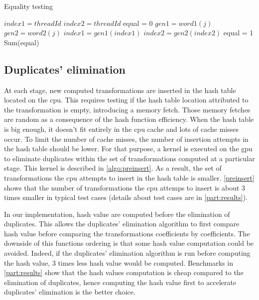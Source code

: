 {\begin{algorithm}
\caption{Equality testing}
\label{algo:equal}
\begin{algorithmic}
\STATE $index1 = threadId$
\STATE $index2 = threadId$
\STATE equal = 0
\STATE $gen1 = word1(j)$
\STATE $gen2 = word2(j)$
\STATE $index1 = gen1(index1)$
\STATE $index2 = gen2(index2)$
\ENDFOR
{}
\STATE equal = 1
\ENDIF
\ENDIF
\STATE Sum(equal)
\end{algorithmic}
\end{algorithm}

\subsection{Duplicates' elimination}
\label{part:preinsert}

At each stage, new computed transformations are inserted in the hash table located on the \gls{cpu}. 
This requires testing if the hash table location attributed to the transformation is empty, introducing a memory fetch. 
Those memory fetches are random as a consequence of the hash function efficiency. 
When the hash table is big enough, it doesn't fit entirely in the \gls{cpu} cache and lots of cache misses occur.
To limit the number of cache misses, the number of insertion attempts in the hash table should be lower. 
For that purpose, a kernel is executed on the \gls{gpu} to eliminate duplicates within the set of transformations computed at a particular stage. 
This kernel is described in \autoref{algo:preinsert}. 
As a result, the set of transformations the \gls{cpu} attempts to insert in the hash table is smaller. 
\autoref{preinsert} shows that the number of transformations the \gls{cpu} attemps to insert is about 3 times smaller in typical test cases 
(details about test cases are in \autoref{part:results}).

In our implementation, hash value are computed before the elimination of duplicates. 
This allows the duplicates' elimination algorithm to first compare hash value before comparing the transformations coefficients by coefficients. 
The downside of this functions ordering is that some hash value computation could be avoided. 
Indeed, if the duplicates' elimination algorithm is run before computing the hash value, 3 times less hash value would be computed. 
Benchmarks in \autoref{part:results} show that the hash values computation is cheap compared to the elimination of duplicates, 
hence computing the hash value first to accelerate duplicates' elimination is the better choice.

}
